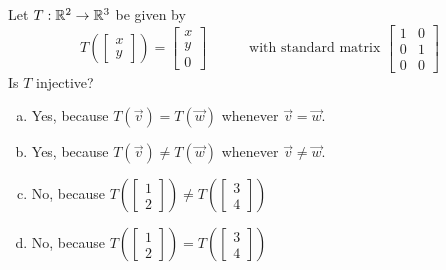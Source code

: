 \begin{activity}{2}
Let $T: \mathbb{R}^2 \rightarrow \mathbb{R}^3$ be given by
\[
  T\left(\begin{bmatrix}x \\ y \end{bmatrix} \right)
    =
  \begin{bmatrix} x \\ y \\ 0 \end{bmatrix}
    \hspace{3em}
    \text{with standard matrix }
  \begin{bmatrix} 1 & 0 \\ 0 & 1 \\ 0 & 0 \end{bmatrix}
\]
Is \(T\) injective?
\begin{enumerate}[a)]
\item Yes, because \(T(\vec v)=T(\vec w)\) whenever \(\vec v=\vec w\).
\item Yes, because \(T(\vec v)\not=T(\vec w)\) whenever \(\vec v\not=\vec w\).
\item No, because 
  \(
    T\left(\begin{bmatrix}1\\2\end{bmatrix}\right)
      \not=
    T\left(\begin{bmatrix}3\\4\end{bmatrix}\right)
  \)
\item No, because 
  \(
    T\left(\begin{bmatrix}1\\2\end{bmatrix}\right)
      =
    T\left(\begin{bmatrix}3\\4\end{bmatrix}\right)
  \)
\end{enumerate}
\end{activity}

